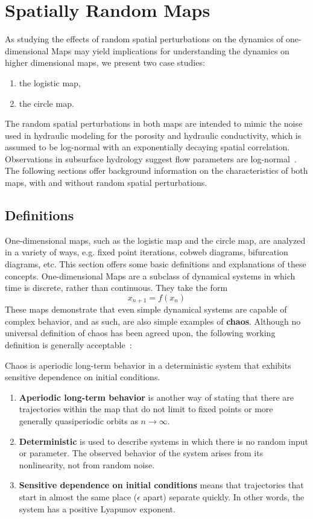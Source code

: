 \chapter{Spatially Random Maps}
\label{background}
As studying the effects of random spatial perturbations
on the dynamics of one-dimensional Maps may yield implications for
understanding the dynamics on higher dimensional maps, we present two
case studies:
\begin{enumerate}
\item the logistic map,
\item the circle map.
\end{enumerate}
The random spatial perturbations in both maps are intended to mimic
the noise used in hydraulic modeling for the porosity and hydraulic
conductivity, which is assumed to be log-normal with an
exponentially decaying spatial correlation. Observations
in subsurface hydrology suggest flow parameters are log-normal~\cite{gelhar}. The following sections
offer background information on the characteristics of both maps, with
and without random spatial perturbations. 
\section{Definitions}
One-dimensional maps, such as the logistic map and the circle map, are
analyzed in a variety of ways, e.g. fixed point iterations,
cobweb diagrams, bifurcation diagrams, etc. This section offers some
basic definitions and explanations of these concepts. One-dimensional Maps are a
subclass of dynamical systems in which time is discrete, rather than
continuous. They take the form
\begin{equation*}
x_{n+1}=f(x_n)
\end{equation*}
These maps demonstrate that even simple dynamical systems are capable
of complex behavior, and as such, are also simple examples of
\textbf{chaos}. Although no universal definition of chaos has been
agreed upon, the following working definition is generally acceptable~\cite{strogatz}:
\begin{singlespace}
\begin{definition}
Chaos is aperiodic long-term behavior in a deterministic
  system that exhibits sensitive dependence on initial conditions.
\end{definition}
\end{singlespace}
\begin{enumerate}
\item \textbf{Aperiodic long-term behavior} is another way of stating
  that there are trajectories within the map that do not limit to
  fixed points or more generally quasiperiodic orbits as $n \to \infty$.
\item \textbf{Deterministic} is used to describe systems in which
  there is no random input or parameter. The observed behavior of the
  system arises from its nonlinearity, not from random noise.
\item \textbf{Sensitive dependence on initial conditions} means that
  trajectories that start in almost the same place ($\epsilon$ apart)
  separate quickly. In other words, the system has a
  positive Lyapunov exponent.
\end{enumerate}

